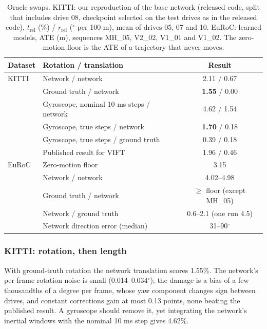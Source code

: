 \documentclass[pdflatex,sn-nature]{sn-jnl}
\newcommand{\tbf}[1]{\textbf{#1}}
\begin{document}
\begin{table}[t]
\caption{Oracle swaps. KITTI: our reproduction of the base network (released code, split that includes drive 08, checkpoint selected on the test drives as in the released code), $t_\mathrm{rel}$ (\%) / $r_\mathrm{rel}$ ($^\circ$ per 100 m), mean of drives 05, 07 and 10. EuRoC: learned models, ATE (m), sequences MH\_05, V2\_02, V1\_01 and V1\_02. The zero-motion floor is the ATE of a trajectory that never moves.}\label{tab:oracle}
\small
\setlength{\tabcolsep}{4pt}
\begin{tabular}{@{}llc@{}}
\toprule
Dataset & Rotation / translation & Result \\
\midrule
KITTI & Network / network & 2.11 / 0.67 \\
 & Ground truth / network & \tbf{1.55} / 0.00 \\
 & Gyroscope, nominal 10 ms steps / network & 4.62 / 1.54 \\
 & Gyroscope, true steps / network & \tbf{1.70} / 0.18 \\
 & Gyroscope, true steps / ground truth & 0.39 / 0.18 \\
 & Published result for VIFT\cite{Kurt2024} & 1.96 / 0.46 \\
\midrule
EuRoC & Zero-motion floor & 3.15 \\
 & Network / network & 4.02--4.98 \\
 & Ground truth / network & $\geq$ floor (except MH\_05) \\
 & Network / ground truth & 0.6--2.1 (one run 4.5) \\
 & Network direction error (median) & 31--90$^\circ$ \\
\bottomrule
\end{tabular}
\end{table}

\subsubsection{KITTI: rotation, then length}

With ground-truth rotation the network translation scores 1.55\%. The network's per-frame rotation noise is small (0.014--0.034$^\circ$); the damage is a bias of a few thousandths of a degree per frame, whose yaw component changes sign between drives, and constant corrections gain at most 0.13 points, none beating the published result. A gyroscope should remove it, yet integrating the network's inertial windows with the nominal 10 ms step gives 4.62\%.
\end{document}
